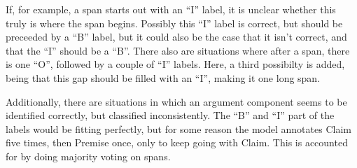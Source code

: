 \documentclass[12]{article}
\theoremstyle{mytheoremstyle}
\theoremstyle{mytheoremstyle}
\theoremstyle{myproblemstyle}
\begin{document}
  If, for example, a span starts out with an ``I'' label, it is unclear whether this truly is where the span begins. 
  Possibly this ``I'' label is correct, but should be preceeded by a ``B'' label, but it could also be the case that it isn't correct, and that the ``I'' should be a ``B''. 
  There also are situations where after a span, there is one ``O'', followed by a couple of ``I'' labels. 
  Here, a third possibilty is added, being that this gap should be filled with an ``I'', making it one long span.

  Additionally, there are situations in which an argument component seems to be identified correctly, but classified inconsistently. 
  The ``B'' and ``I'' part of the labels would be fitting perfectly, but for some reason the model annotates Claim five times, then Premise once, only to keep going with Claim. 
  This is accounted for by doing majority voting on spans.
\end{document}
